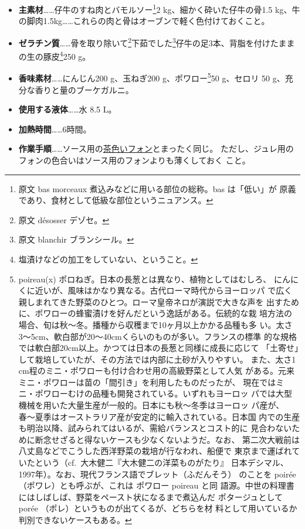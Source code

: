 \begin{recette}
\begin{itemize}
\item
  \textbf{主素材}\ldots{}\ldots{}仔牛のすね肉とバモルソー\footnote{原文
    bas morceaux 煮込みなどに用いる部位の総称。bas は「低い」が
    原義であり、食材として低級な部位というニュアンス。}2
  kg、細かく砕いた仔牛の骨1.5
  kg、牛の脚肉1.5kg\ldots{}\ldots{}これらの肉と骨はオーブンで軽く色付けておくこと。
\item
  \textbf{ゼラチン質}\ldots{}\ldots{}骨を取り除いて\footnote{原文
    désosser デゾセ。}下茹でした\footnote{原文 blanchir ブランシール。}仔牛の足3本、背脂を付けたままの生の豚皮\footnote{塩漬けなどの加工をしていない、ということ。}250
  g。
\item
  \textbf{香味素材}\ldots{}\ldots{}にんじん200 g、玉ねぎ200
  g、ポワロー\footnote{poireau(x)
    ポロねぎ。日本の長葱とは異なり、植物としてはむしろ、
    にんにくに近いが、風味はかなり異なる。古代ローマ時代からヨーロッパ
    で広く親しまれてきた野菜のひとつ。ローマ皇帝ネロが演説で大きな声を
    出すために、ポワローの蜂蜜漬けを好んだという逸話がある。伝統的な栽
    培方法の場合、旬は秋〜冬。播種から収穫まで10ヶ月以上かかる品種も多
    い。太さ3〜5cm、軟白部が20〜40cmくらいのものが多い。フランスの標準
    的な規格では軟白部20cm以上。かつては日本の長葱と同様に成長に応じて
    「土寄せ」して栽培していたが、その方法では内部に土砂が入りやすい。
    また、太さ1 cm程のミニ・ポワローも付け合わせ用の高級野菜として人気
    がある。元来ミニ・ポワローは苗の「間引き」を利用したものだったが、
    現在ではミニ・ポワローむけの品種も開発されている。いずれもヨーロッ
    パでは大型機械を用いた大量生産が一般的。日本にも秋〜冬季はヨーロッ
    パ産が、春〜夏季はオーストラリア産が安定的に輸入されている。日本国
    内での生産も明治以降、試みられてはいるが、需給バランスとコスト的に
    見合わないために断念せざると得ないケースも少なくないようだ。なお、
    第二次大戦前は八丈島などでこうした西洋野菜の栽培が行なわれ、船便で
    東京まで運ばれていたという（cf.~大木健二『大木健二の洋菜ものがたり』
    日本デシマル、1997年）。なお、現代フランス語でブレット（ふだんそう）
    のことを poirée （ポワレ）とも呼ぶが、これは ポワロー poireau と同
    語源。中世の料理書にはしばしば、野菜をペースト状になるまで煮込んだ
    ポタージュとして porée （ポレ）というものが出てくるが、どちらを材
    料として用いているか判別できないケースもある。}50 g、セロリ 50
  g、充分な香りと量のブーケガルニ。
\item
  \textbf{使用する液体}\ldots{}\ldots{}水 8.5 L。
\item
  \textbf{加熱時間}\ldots{}\ldots{}6時間。
\item
  \textbf{作業手順}\ldots{}\ldots{}ソース用の\protect\hyperlink{fonds-brun}{茶色いフォン}とまったく同じ。
  ただし、ジュレ用のフォンの色合いはソース用のフォンよりも薄くしておく
  こと。
\end{itemize}


\end{recette}
